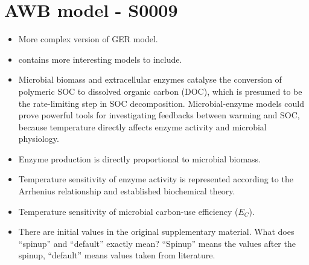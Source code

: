 \documentclass[american, 12pt]{article}
\newcommand{\red}[1]{{\color{red}#1}}
\begin{document}
\section{AWB model - S0009}
\citep{Allison2010NatureGeoscience, Li2014Biogeochemistry}
\begin{itemize}
  \item More complex version of \red{GER model}.
  \item \red{\cite{Li2014Biogeochemistry} contains more interesting models to include.}
  \item Microbial biomass and extracellular enzymes catalyse the conversion of polymeric SOC to dissolved organic carbon (DOC), which is presumed to be the rate-limiting step in SOC decomposition. Microbial-enzyme models could prove powerful tools for investigating feedbacks between warming and SOC, because temperature directly affects enzyme activity and microbial physiology.
  \item Enzyme production is directly proportional to microbial biomass.
  \item Temperature sensitivity of enzyme activity is represented according to the Arrhenius relationship and established biochemical theory.
  \item Temperature sensitivity of microbial carbon-use efficiency ($E_C$).
  \item There are initial values in the original supplementary material. What does ``spinup'' and ``default'' exactly mean?
	``Spinup'' means the values after the spinup, ``default'' means values taken from literature.
\end{itemize}
\end{document}

